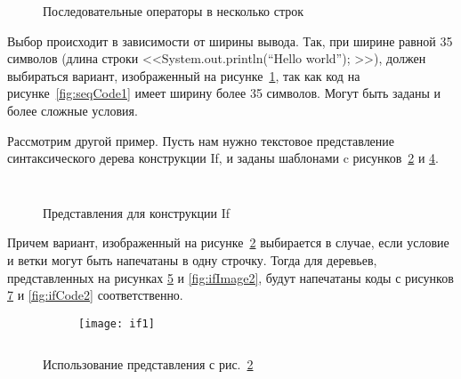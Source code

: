 \begin{figure}[h]
	\inputminted{c}{codes/seqCode2.java}
	\caption{Последовательные операторы в несколько строк}
	\label{fig:seqCode2}
\end{figure}

Выбор происходит в зависимости от ширины вывода. Так, при ширине равной 35 символов (длина строки <<System.out.println(“Hello world”); >>), должен выбираться вариант, изображенный на рисунке~\ref{fig:seqCode2}, так как код на рисунке~\ref{fig:seqCode1} имеет ширину более 35 символов.
Могут быть заданы и более сложные условия.

\newpage

Рассмотрим другой пример. Пусть нам нужно текстовое представление синтаксического дерева конструкции If, и заданы шаблонами c рисунков~\ref{fig:ifTemplate2} и \ref{fig:ifTemplate1}.

\begin{figure}[h]
	\begin{subfigure}[b]{0.45\textwidth}
		\inputminted{haskell}{codes/ifTemplate2.hs}
		\caption{}
		\label{fig:ifTemplate2}
	\end{subfigure}
	\begin{subfigure}[b]{0.45\textwidth}
		\inputminted{haskell}{codes/ifTemplate1.hs}
		\caption{}
		\label{fig:ifTemplate1}
	\end{subfigure}
	\caption{Представления для конструкции If}
\end{figure}


Причем вариант, изображенный на рисунке~\ref{fig:ifTemplate2} выбирается в случае, если условие и ветки могут быть напечатаны в одну строчку. Тогда для деревьев, представленных на рисунках \ref{fig:ifImage1} и \ref{fig:ifImage2}, будут напечатаны коды с рисунков \ref{fig:ifCode1} и \ref{fig:ifCode2} соответственно.

\begin{figure}[h!]
	\begin{subfigure}[b]{0.65\linewidth}
		\centering
		\texttt{[image: if1]}
		\caption{}
		\label{fig:ifImage1}
	\end{subfigure}
	\hspace{0.5cm}
	\begin{subfigure}[b]{0.25\linewidth}
		\centering
		\inputminted{haskell}{codes/ifCode1.hs}
		\caption{}
		\label{fig:ifCode1}
	\end{subfigure}

	\caption{Использование представления с рис.~\ref{fig:ifTemplate2}}
\end{figure}

